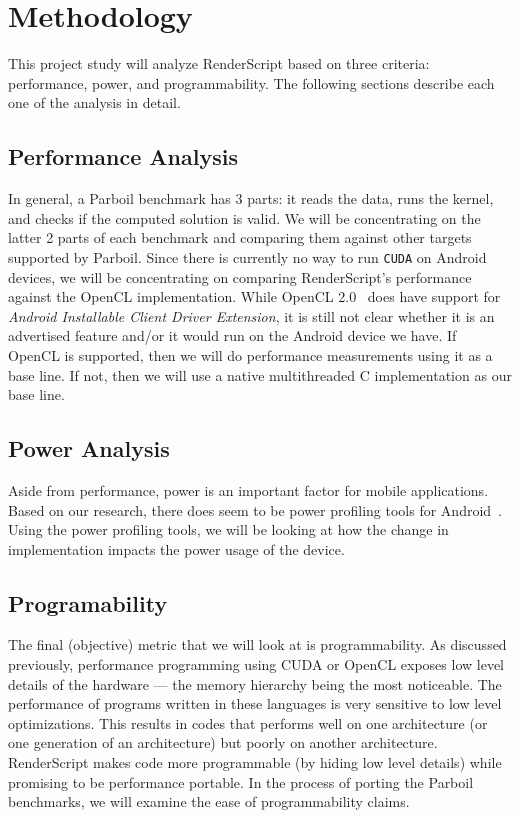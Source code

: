 
\section{Methodology}

This project study will analyze RenderScript based on three criteria: performance, power, and programmability.
The following sections describe each one of the analysis in detail.


\subsection{Performance Analysis}

In general, a Parboil benchmark has 3 parts: it reads the data, runs the kernel, and checks if the 
    computed solution is valid.
We will be concentrating on the latter 2 parts of each benchmark and comparing them against other
    targets supported by Parboil.
Since there is currently no way to run {\tt CUDA} on Android devices, we will be concentrating
    on comparing RenderScript's performance against the OpenCL implementation.
While OpenCL 2.0~\cite{OpenCL} does
	have support for \textit{Android Installable Client Driver Extension}, it is still not clear whether 
    it is an advertised feature and/or it would run on the Android device we have.
If OpenCL is supported, then we will do performance measurements using it as a base line.
If not, then we will use a native multithreaded C implementation as our base line.

\subsection{Power Analysis}

Aside from performance, power is an important factor for mobile applications.
Based on our research, there does seem to be power profiling tools for Android~\cite{Google:2014:Power}.
Using the power profiling tools, we will be looking at how the change in
    implementation impacts the power usage of the device.

\subsection{Programability}

The final (objective) metric that we will look at is programmability.
As discussed previously, performance programming using CUDA or OpenCL
    exposes low level details of the hardware --- the memory hierarchy being the most noticeable.
The performance of programs written in these languages is very sensitive to low
	level optimizations.
This results in codes that performs well on one architecture (or one generation of an architecture)
    but poorly on another architecture.
RenderScript makes code more programmable (by hiding low level details) while promising to be performance
	portable.
In the process of porting the Parboil benchmarks, we will
	examine the ease of programmability claims.


